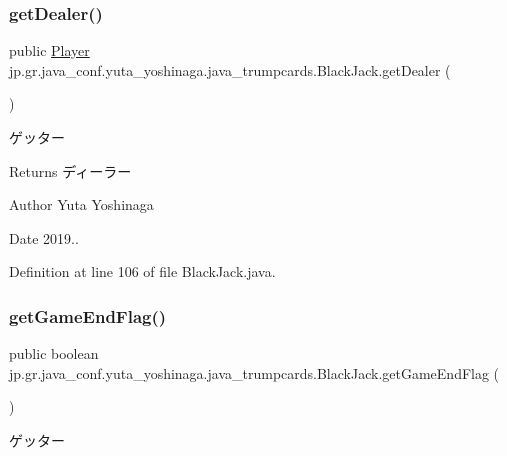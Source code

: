 \subsubsection{\texorpdfstring{get\+Dealer()}{getDealer()}}
{\footnotesize\ttfamily public \hyperlink{classjp_1_1gr_1_1java__conf_1_1yuta__yoshinaga_1_1java__trumpcards_1_1_player}{Player} jp.\+gr.\+java\+\_\+conf.\+yuta\+\_\+yoshinaga.\+java\+\_\+trumpcards.\+Black\+Jack.\+get\+Dealer (\begin{DoxyParamCaption}{ }\end{DoxyParamCaption})}



ゲッター 

\begin{DoxyReturn}{Returns}
ディーラー 
\end{DoxyReturn}
\begin{DoxyAuthor}{Author}
Yuta Yoshinaga 
\end{DoxyAuthor}
\begin{DoxyDate}{Date}
2019.. 
\end{DoxyDate}


Definition at line 106 of file Black\+Jack.\+java.

\mbox{\label{classjp_1_1gr_1_1java__conf_1_1yuta__yoshinaga_1_1java__trumpcards_1_1_black_jack_aa541fa5982861610f084bede8c5d6ac1}} 
\subsubsection{\texorpdfstring{get\+Game\+End\+Flag()}{getGameEndFlag()}}
{\footnotesize\ttfamily public boolean jp.\+gr.\+java\+\_\+conf.\+yuta\+\_\+yoshinaga.\+java\+\_\+trumpcards.\+Black\+Jack.\+get\+Game\+End\+Flag (\begin{DoxyParamCaption}{ }\end{DoxyParamCaption})}



ゲッター 

